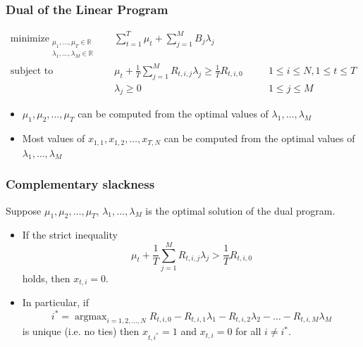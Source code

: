 \documentclass[usenames,dvipsnames]{beamer}
\DeclareMathOperator*{\argmax}{argmax}
\DeclareMathOperator*{\minimize}{minimize}
\DeclareMathOperator*{\subjectto}{subject\ to}
\newcommand{\R}{\mathbb{R}}
\begin{document}
\begin{frame}
\frametitle{Dual of the Linear Program}

\begin{align*}
\minimize_{\substack{\mu_1, \dots, \mu_T \in \R \\ \lambda_1, \dots, \lambda_M \in \R}} \quad & \sum_{t=1}^T \mu_t + \sum_{j=1}^M B_j \lambda_j \\
\subjectto \quad & \mu_t + \frac{1}{T} \sum_{j=1}^M R_{t,i,j} \lambda_j  \ge \frac{1}{T} R_{t,i,0} && \quad 1 \le i \le N, 1 \le t \le T \\
& \lambda_j \ge 0 && \quad 1 \le j \le M
\end{align*}

\begin{itemize}
\item $\mu_1, \mu_2, \dots, \mu_T$ can be computed from the optimal values of $\lambda_1, \dots, \lambda_M$
\item Most values of $x_{1,1}, x_{1,2}, \dots, x_{T,N}$ can be computed from the optimal values of $\lambda_1, \dots, \lambda_M$
\end{itemize}

\end{frame}

\begin{frame}
\frametitle{Complementary slackness}

\begin{lemma}
Suppose $\mu_1, \mu_2, \dots, \mu_T$, $\lambda_1, \dots, \lambda_M$ is the optimal solution of the dual program.
\begin{itemize}
\item If the strict inequality
$$
\mu_t + \frac{1}{T} \sum_{j=1}^M R_{t,i,j} \lambda_j  > \frac{1}{T} R_{t,i,0}
$$
holds, then $x_{t,i} = 0$.

\item In particular, if
$$
i^* = \argmax_{i=1,2,\dots,N} R_{t,i,0} - R_{t,i,1} \lambda_1 - R_{t,i,2} \lambda_2 - \dots - R_{t,i,M} \lambda_M
$$
is unique (i.e. no ties) then $x_{t,i^*} = 1$ and $x_{t,i} = 0$ for all $i \neq i^*$.
\end{itemize}
\end{lemma}

\end{frame}
\end{document}
